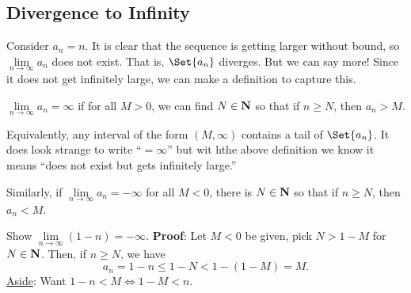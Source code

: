 \subsection{Divergence to Infinity}
Consider $ a_n=n $. It is clear that the sequence is getting larger without bound, so $ \lim\limits_{{n} \to {\infty}}a_n $
does not exist. That is, $ \Set{a_n} $ diverges. But we can say more! Since it does not get infinitely large,
we can make a definition to capture this.
\begin{Definition}{}{}
    $ \lim\limits_{{n} \to {\infty}}a_n=\infty $ if for all $ M>0 $, we can find $ N\in\mathbf{N} $ so that if $ n\ge N $,
    then $ a_n>M $.

    Equivalently, any interval of the form $ (M,\infty) $ contains a tail of $ \Set{a_n} $.
    \tcblower{}
    It does look strange to write ``$ =\infty $'' but wit hthe above definition we know it means ``does not exist but gets infinitely large.''

    Similarly, if $ \lim\limits_{{n} \to {\infty}}a_n=-\infty $ for all $ M<0 $, there is $ N\in\mathbf{N} $ so that if $ n\ge N $, then $ a_n<M $.
\end{Definition}
\begin{Example}{}{}
    Show $ \lim\limits_{{n} \to {\infty}}(1-n)=-\infty $.
    \tcblower{}
    \textbf{Proof}: Let $ M<0 $ be given, pick $ N>1-M $ for $ N\in\mathbf{N} $. Then, if $ n\ge N $, we have
    \[ a_n=1-n\le 1-N<1-(1-M)=M. \]
    \underline{Aside}: Want $ 1-n<M\iff 1-M<n $.
\end{Example}